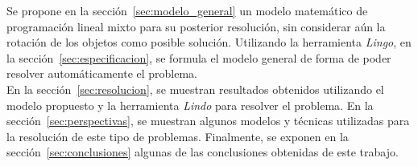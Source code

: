 Se propone en la sección~\ref{sec:modelo_general} un modelo matemático de programación
lineal mixto para su posterior resolución, sin considerar aún la
rotación de los objetos como posible solución.
Utilizando la herramienta \textit{Lingo}, en la sección~\ref{sec:especificacion},
se formula el modelo general de forma de poder resolver automáticamente el
problema. \\

En la sección~\ref{sec:resolucion}, se muestran resultados obtenidos utilizando el
modelo propuesto y la herramienta \textit{Lindo} para resolver el problema.
En la sección~\ref{sec:perspectivas}, se muestran algunos modelos y técnicas
utilizadas para la resolución de este tipo de problemas.
Finalmente, se exponen en la sección~\ref{sec:conclusiones} algunas de las
conclusiones obtenidas de este trabajo.
